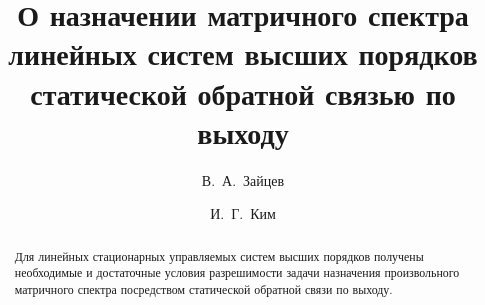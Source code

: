 
\usepackage{todonotes} %

\usepackage[russian]{nla}

%
%


%




%
\fi

\title{О назначении матричного спектра \\ линейных систем высших порядков \\ статической обратной связью по выходу}
\author{В.~А.~Зайцев   %
  \and  %
  И.~Г.~Ким 
} %


\maketitle

\begin{abstract}
Для линейных стационарных управляемых систем высших порядков получены необходимые и достаточные условия разрешимости задачи назначения произвольного матричного спектра
посредством статической обратной связи по выходу.

\end{abstract}

